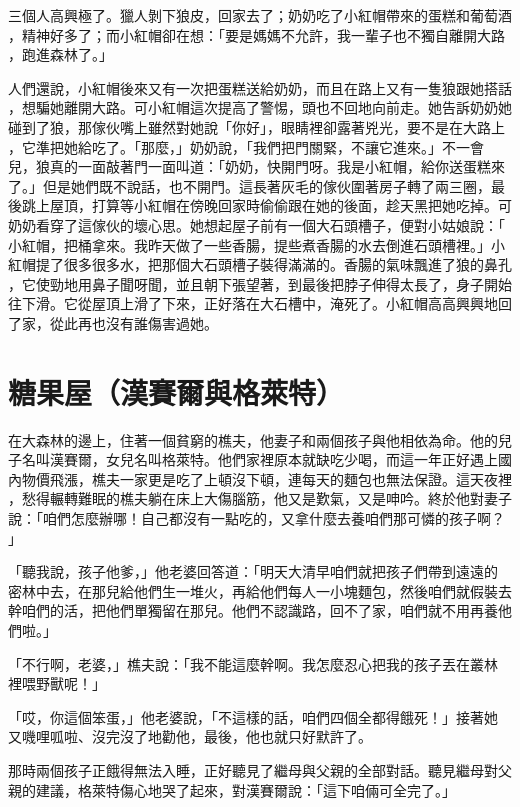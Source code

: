 \documentclass[oneside,11pt]{memoir} %
\begin{document}
三個人高興極了。獵人剝下狼皮，回家去了；奶奶吃了小紅帽帶來的蛋糕和葡萄酒
，精神好多了；而小紅帽卻在想：「要是媽媽不允許，我一輩子也不獨自離開大路
，跑進森林了。」

人們還說，小紅帽後來又有一次把蛋糕送給奶奶，而且在路上又有一隻狼跟她搭話
，想騙她離開大路。可小紅帽這次提高了警惕，頭也不回地向前走。她告訴奶奶她
碰到了狼，那傢伙嘴上雖然對她說「你好」，眼睛裡卻露著兇光，要不是在大路上
，它準把她給吃了。「那麼，」奶奶說，「我們把門關緊，不讓它進來。」不一會
兒，狼真的一面敲著門一面叫道：「奶奶，快開門呀。我是小紅帽，給你送蛋糕來
了。」但是她們既不說話，也不開門。這長著灰毛的傢伙圍著房子轉了兩三圈，最
後跳上屋頂，打算等小紅帽在傍晚回家時偷偷跟在她的後面，趁天黑把她吃掉。可
奶奶看穿了這傢伙的壞心思。她想起屋子前有一個大石頭槽子，便對小姑娘說：「
小紅帽，把桶拿來。我昨天做了一些香腸，提些煮香腸的水去倒進石頭槽裡。」小
紅帽提了很多很多水，把那個大石頭槽子裝得滿滿的。香腸的氣味飄進了狼的鼻孔
，它使勁地用鼻子聞呀聞，並且朝下張望著，到最後把脖子伸得太長了，身子開始
往下滑。它從屋頂上滑了下來，正好落在大石槽中，淹死了。小紅帽高高興興地回
了家，從此再也沒有誰傷害過她。


\chapter{糖果屋（漢賽爾與格萊特）}

在大森林的邊上，住著一個貧窮的樵夫，他妻子和兩個孩子與他相依為命。他的兒
子名叫漢賽爾，女兒名叫格萊特。他們家裡原本就缺吃少喝，而這一年正好遇上國
內物價飛漲，樵夫一家更是吃了上頓沒下頓，連每天的麵包也無法保證。這天夜裡
，愁得輾轉難眠的樵夫躺在床上大傷腦筋，他又是歎氣，又是呻吟。終於他對妻子
說：「咱們怎麼辦哪！自己都沒有一點吃的，又拿什麼去養咱們那可憐的孩子啊？
」

「聽我說，孩子他爹，」他老婆回答道：「明天大清早咱們就把孩子們帶到遠遠的
密林中去，在那兒給他們生一堆火，再給他們每人一小塊麵包，然後咱們就假裝去
幹咱們的活，把他們單獨留在那兒。他們不認識路，回不了家，咱們就不用再養他
們啦。」

「不行啊，老婆，」樵夫說：「我不能這麼幹啊。我怎麼忍心把我的孩子丟在叢林
裡喂野獸呢！」

「哎，你這個笨蛋，」他老婆說，「不這樣的話，咱們四個全都得餓死！」接著她
又嘰哩呱啦、沒完沒了地勸他，最後，他也就只好默許了。

那時兩個孩子正餓得無法入睡，正好聽見了繼母與父親的全部對話。聽見繼母對父
親的建議，格萊特傷心地哭了起來，對漢賽爾說：「這下咱倆可全完了。」
\end{document}
